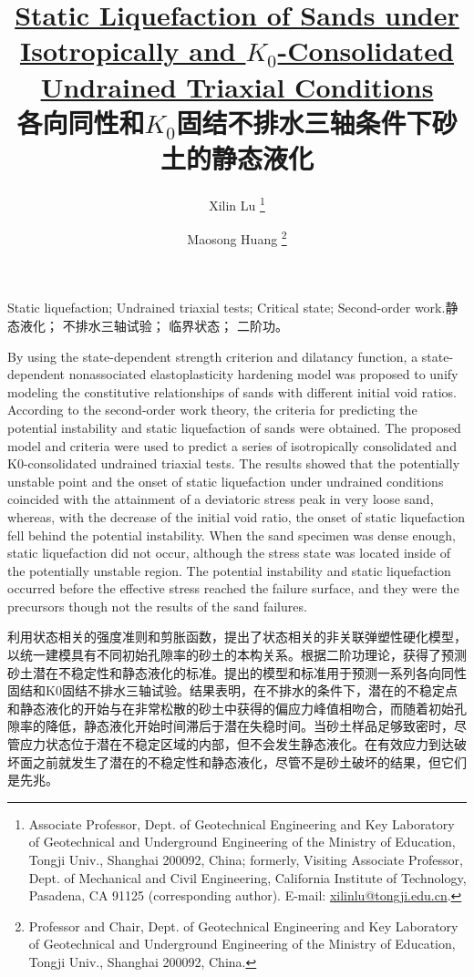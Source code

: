 \documentclass{bilidoc}
\title{\textbf{\href{https://doi.org/10.1061/(ASCE)GT.1943-5606.0001206}{Static Liquefaction of Sands under Isotropically and $K_0$-Consolidated Undrained Triaxial Conditions }\\各向同性和$K_0$固结不排水三轴条件下砂土的静态液化}}
\author{Xilin Lu \thanks{
    Associate Professor, Dept. of Geotechnical Engineering and Key Laboratory of Geotechnical and Underground Engineering of the Ministry of Education, Tongji Univ., Shanghai 200092, China; formerly, Visiting Associate Professor, Dept. of Mechanical and Civil Engineering, California Institute of Technology, Pasadena, CA 91125 (corresponding author). E-mail: \url{xilinlu@tongji.edu.cn}.
} \and Maosong Huang \thanks{
    Professor and Chair, Dept. of Geotechnical Engineering and Key Laboratory of Geotechnical and Underground Engineering of the Ministry of Education, Tongji Univ., Shanghai 200092, China.
}}
\date{}
\begin{document}
\maketitle

\begin{Abstract}{Static liquefaction; Undrained triaxial tests; Critical state; Second-order work.}{静态液化； 不排水三轴试验； 临界状态； 二阶功。}

    By using the state-dependent strength criterion and dilatancy function, a state-dependent nonassociated elastoplasticity hardening model was proposed to unify modeling the constitutive relationships of sands with different initial void ratios. According to the second-order work theory, the criteria for predicting the potential instability and static liquefaction of sands were obtained. The proposed model and criteria were used to predict a series of isotropically consolidated and K0-consolidated undrained triaxial tests. The results showed that the potentially unstable point and the onset of static liquefaction under undrained conditions coincided with the attainment of a deviatoric stress peak in very loose sand, whereas, with the decrease of the initial void ratio, the onset of static liquefaction fell behind the potential instability. When the sand specimen was dense enough, static liquefaction did not occur, although the stress state was located inside of the potentially unstable region. The potential instability and static liquefaction occurred before the effective stress reached the failure surface, and they were the precursors though not the results of the sand failures.

    \switchcolumn

    利用状态相关的强度准则和剪胀函数，提出了状态相关的非关联弹塑性硬化模型，以统一建模具有不同初始孔隙率的砂土的本构关系。根据二阶功理论，获得了预测砂土潜在不稳定性和静态液化的标准。提出的模型和标准用于预测一系列各向同性固结和K0固结不排水三轴试验。结果表明，在不排水的条件下，潜在的不稳定点和静态液化的开始与在非常松散的砂土中获得的偏应力峰值相吻合，而随着初始孔隙率的降低，静态液化开始时间滞后于潜在失稳时间。当砂土样品足够致密时，尽管应力状态位于潜在不稳定区域的内部，但不会发生静态液化。在有效应力到达破坏面之前就发生了潜在的不稳定性和静态液化，尽管不是砂土破坏的结果，但它们是先兆。
    
\end{Abstract}












\begin{multicols}{2}
    
\end{multicols}


    
\end{document}
